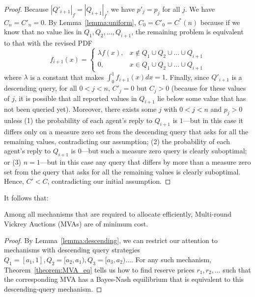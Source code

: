 \begin{proof}
Because $|Q'_{i+1}|_f = |Q_{i+1}|_f$,
we have $p'_j = p_j$
for all $j$.  We have $C_n = C'_n = 0$.
By Lemma~\ref{lemma:uniform},
$C_0 = C'_0 = C^*(n)$ 
because if we know that no value lies in $Q_1, Q_2, \ldots, Q_{i+1}$, the
remaining problem  is equivalent to that with the revised PDF
\[
f_{i+1}(x) = \begin{cases}
	\lambda f(x), & x \notin Q_1 \cup Q_2 \cup \ldots \cup Q_{i+1} \\
	0, & x \in Q_1 \cup Q_2 \cup \ldots \cup Q_{i+1}
\end{cases}
\]
where $\lambda$ is a constant that makes $\int_0^1 f_{i+1}(x) dx = 1$.
Finally, since $Q'_{i+1}$ is a descending query, for all $0 < j < n$,
$C'_j = 0$ but $C_j > 0$ (because for these values of $j$, it is possible
that all reported values in $Q_{i+1}$ lie below some value that has not
been queried yet).  Moreover, there exists some $j$ with $0 < j < n$ and
$p_j > 0$ unless (1) the probability of each agent's reply to $Q_{i+1}$ is
$1$---but in this case it differs only on a measure zero set from the
descending query that asks for all the remaining values, contradicting our
assumption; (2) the probability of each agent's reply to $Q_{i+1}$ is
$0$---but such a measure zero query is clearly suboptimal;
or (3) $n=1$---but in this case any query that differs by more
than a measure zero set from the query that asks for all the remaining
values is clearly suboptimal.
Hence, $C' < C$, contradicting our initial assumption.
\end{proof}

It follows that:


\begin{theorem}\label{theorem:MVA_eq}
Among all mechanisms
that are
required to allocate efficiently,
Multi-round Vickrey Auctions (MVAs) are of minimum cost.
\end{theorem}

\begin{proof}
By Lemma~\ref{lemma:descending}, we can restrict our attention to
mechanisms with  descending query strategies
$Q_1 = [a_1, 1], Q_2 = [a_2, a_1), Q_3 = [a_3, a_2) \ldots$.
For any such mechanism, Theorem~\ref{theorem:MVA_eq} tells us how to find reserve prices $r_1, r_2,
\ldots$ such that the corresponding MVA has a Bayes-Nash equilibrium that
is equivalent to this descending-query mechanism.
\end{proof}

